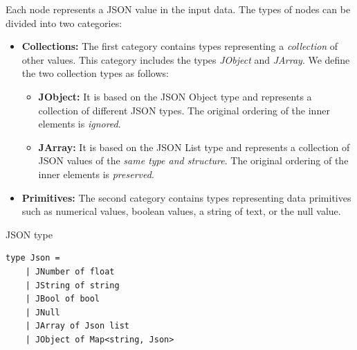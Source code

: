 Each node represents a JSON value in the input data.
The types of nodes can be divided into two categories:
\begin{itemize}
	\item {\textbf{Collections:} The first category contains types representing a \emph{collection} of other values. This category includes the types \emph{JObject} and \emph{JArray}.
	      We define the two collection types as follows:
	      \begin{itemize}
		      \item \textbf{JObject:} It is based on the JSON Object type and represents a collection of different JSON types. The original ordering of the inner elements is \emph{ignored}.
		      \item \textbf{JArray:} It is based on the JSON List type and represents a collection of JSON values of the \emph{same type and structure}. The original ordering of the inner elements is \emph{preserved}.
	      \end{itemize}
	      }
	\item \textbf{Primitives:} The second category contains types representing data primitives such as numerical values, boolean values,
	      a string of text, or the null value.
\end{itemize}

\begin{listing}[H]
	\caption {JSON type}
	\label{fig:json}
	\begin{lstlisting}
type Json =
    | JNumber of float
    | JString of string
    | JBool of bool
    | JNull
    | JArray of Json list
    | JObject of Map<string, Json>
  \end{lstlisting}
\end{listing}

